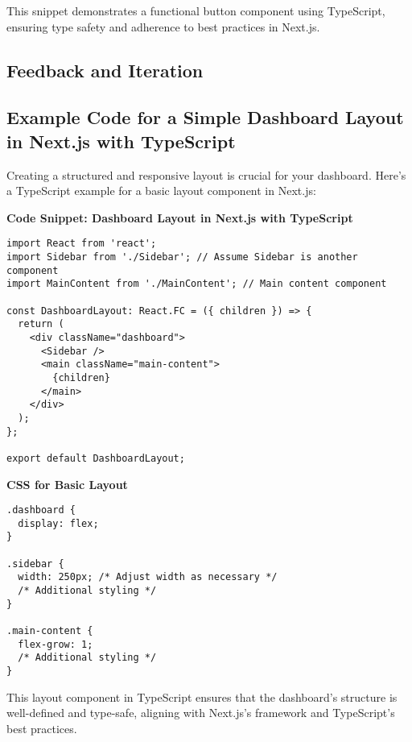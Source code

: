 This snippet demonstrates a functional button component using TypeScript, ensuring type safety and adherence to best practices in Next.js.

\subsection*{Feedback and Iteration}

\subsection*{Example Code for a Simple Dashboard Layout in Next.js with TypeScript}
Creating a structured and responsive layout is crucial for your dashboard. Here's a TypeScript example for a basic layout component in Next.js:

\textbf{Code Snippet: Dashboard Layout in Next.js with TypeScript}
\begin{verbatim}
import React from 'react';
import Sidebar from './Sidebar'; // Assume Sidebar is another component
import MainContent from './MainContent'; // Main content component

const DashboardLayout: React.FC = ({ children }) => {
  return (
    <div className="dashboard">
      <Sidebar />
      <main className="main-content">
        {children}
      </main>
    </div>
  );
};

export default DashboardLayout;
\end{verbatim}

\textbf{CSS for Basic Layout}
\begin{verbatim}
.dashboard {
  display: flex;
}

.sidebar {
  width: 250px; /* Adjust width as necessary */
  /* Additional styling */
}

.main-content {
  flex-grow: 1;
  /* Additional styling */
}
\end{verbatim}

This layout component in TypeScript ensures that the dashboard's structure is well-defined and type-safe, aligning with Next.js's framework and TypeScript's best practices.
